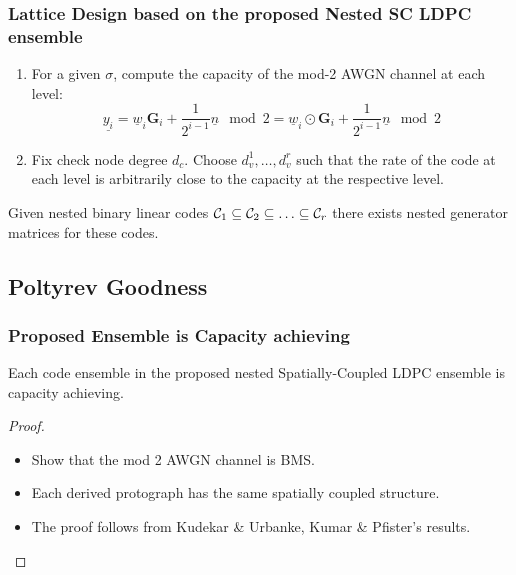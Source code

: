 \documentclass[10pt,presentation]{beamer}
\begin{document}
\begin{frame}\frametitle{Lattice Design based on the proposed Nested SC LDPC ensemble}
\begin{enumerate}
\item For a given $\sigma$, compute the capacity of the mod-2 AWGN channel at each level:
		$$
         \underline{y_{i}}= \underline{w}_i \mathbf{G}_i +\frac{1}{2^{i-1}} \underline{n}\mod 2=\underline{w}_i \odot \mathbf{G}_i + \boxed{\frac{1}{2^{i-1}}\underline{n} \mod 2}
         $$
         \vspace{0.08in}

\item Fix check node degree $d_{c}$. Choose $d_{v}^{1},\ldots ,d_{v}^{r}$ such that the rate of the code at each level is arbitrarily close to the capacity at the respective level.
\end{enumerate}
\pause
\begin{lemma}\label{lemma:nested_G}
    Given nested binary linear codes $\mathcal{C}_{1}\subseteq \mathcal{C}_{2}\subseteq\ldots \subseteq\mathcal{C}_{r}$ there exists nested generator matrices for these codes.
\end{lemma}
\end{frame}

\subsection{Poltyrev Goodness}
\begin{frame}\frametitle{Proposed Ensemble is Capacity achieving}
\begin{theorem}
Each code ensemble in the proposed nested Spatially-Coupled LDPC ensemble is capacity achieving. 
\end{theorem}    
\begin{proof}
\begin{itemize}
        \item Show that the mod 2 AWGN channel is BMS.
        \item Each derived protograph has the same spatially coupled structure.
        \item The proof follows from Kudekar \& Urbanke, Kumar \& Pfister's  results.
    \end{itemize}
\end{proof}
\end{frame}
\end{document}
